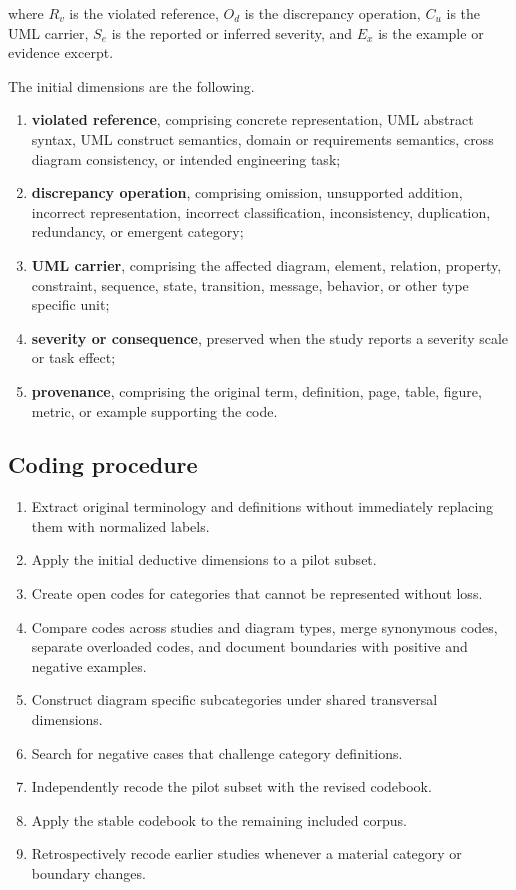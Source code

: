 where $R_v$ is the violated reference, $O_d$ is the discrepancy operation, $C_u$ is the UML carrier, $S_e$ is the reported or inferred severity, and $E_x$ is the example or evidence excerpt.

The initial dimensions are the following.

\begin{enumerate}[label=\roman*)]
    \item \textbf{violated reference}, comprising concrete representation, UML abstract syntax, UML construct semantics, domain or requirements semantics, cross diagram consistency, or intended engineering task;
    \item \textbf{discrepancy operation}, comprising omission, unsupported addition, incorrect representation, incorrect classification, inconsistency, duplication, redundancy, or emergent category;
    \item \textbf{UML carrier}, comprising the affected diagram, element, relation, property, constraint, sequence, state, transition, message, behavior, or other type specific unit;
    \item \textbf{severity or consequence}, preserved when the study reports a severity scale or task effect;
    \item \textbf{provenance}, comprising the original term, definition, page, table, figure, metric, or example supporting the code.
\end{enumerate}

\subsection{Coding procedure}

\begin{enumerate}[label=\arabic*)]
    \item Extract original terminology and definitions without immediately replacing them with normalized labels.
    \item Apply the initial deductive dimensions to a pilot subset.
    \item Create open codes for categories that cannot be represented without loss.
    \item Compare codes across studies and diagram types, merge synonymous codes, separate overloaded codes, and document boundaries with positive and negative examples.
    \item Construct diagram specific subcategories under shared transversal dimensions.
    \item Search for negative cases that challenge category definitions.
    \item Independently recode the pilot subset with the revised codebook.
    \item Apply the stable codebook to the remaining included corpus.
    \item Retrospectively recode earlier studies whenever a material category or boundary changes.
\end{enumerate}

